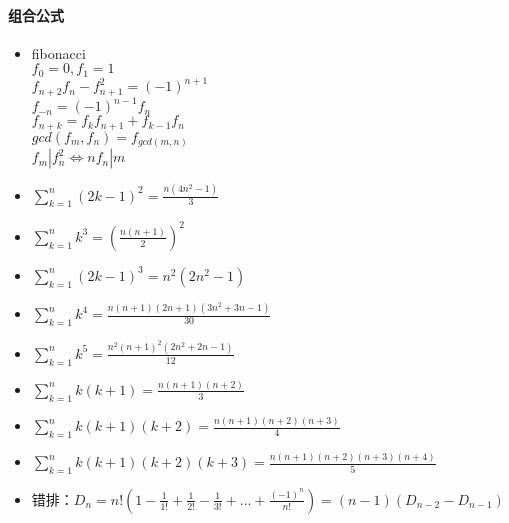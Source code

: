 \paragraph{组合公式}
\begin{itemize}
\item
fibonacci\\
$f_0=0, f_1=1$\\
$f_{n+2}f_n-f_{n+1}^2=(-1)^{n+1}$\\
$f_{-n}=(-1)^{n-1}f_n$\\
$f_{n+k}=f_kf_{n+1}+f_{k-1}f_n$\\
$gcd(f_m, f_n)=f_{gcd(m, n)}$\\
$f_m|f_n^2\Leftrightarrow nf_n|m$\\

\item
  $\sum_{k=1}^{n}(2k-1)^2 = \frac{n(4n^2-1)}{3}	$
\item
  $\sum_{k=1}^{n}k^3 = (\frac{n(n+1)}{2})^2	$
\item
  $\sum_{k=1}^{n}(2k-1)^3 = n^2(2n^2-1)	$
\item
  $\sum_{k=1}^{n}k^4 = \frac{n(n+1)(2n+1)(3n^2+3n-1)}{30}  $
\item
  $\sum_{k=1}^{n}k^5 = \frac{n^2(n+1)^2(2n^2+2n-1)}{12}	$
\item
  $\sum_{k=1}^{n}k(k+1) = \frac{n(n+1)(n+2)}{3}	$
\item
  $\sum_{k=1}^{n}k(k+1)(k+2) = \frac{n(n+1)(n+2)(n+3)}{4} $
\item
  $\sum_{k=1}^{n}k(k+1)(k+2)(k+3) = \frac{n(n+1)(n+2)(n+3)(n+4)}{5} $
\item
  $\mbox{错排：}D_n = n!(1-\frac{1}{1!}+\frac{1}{2!}-\frac{1}{3!}+\ldots+\frac{(-1)^n}{n!}) = (n-1)(D_{n-2}-D_{n-1})$
\end{itemize}

